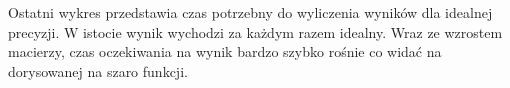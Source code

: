 \documentclass[8pt]{article}
\begin{document}
\begin{center}
\end{center}


Ostatni wykres przedstawia czas potrzebny do wyliczenia wyników dla idealnej precyzji. W istocie wynik wychodzi za każdym razem idealny. Wraz ze wzrostem macierzy, czas oczekiwania na wynik bardzo szybko rośnie co widać na dorysowanej na szaro funkcji.

\begin{center}
\end{center}
\end{document}
